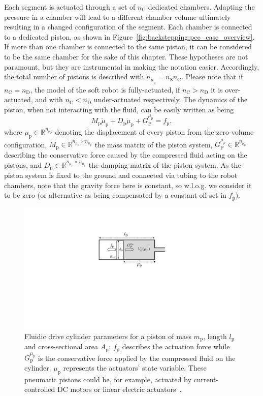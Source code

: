 %
Each segment is actuated through a set of $n_{\mathrm{C}}$ dedicated chambers.
%
Adapting the pressure in a chamber will lead to a different chamber volume ultimately resulting in a changed configuration of the segment.
%
Each chamber is connected to a dedicated piston, as shown in Figure~\ref{fig:backstepping:pcc_case_overview}. If more than one chamber is connected to the same piston, it can be considered to be the same chamber for the sake of this chapter.
%
These hypotheses are not paramount, but they are instrumental in making the notation easier.
%
Accordingly, the total number of pistons is described with $n_{\mu_\mathrm{p}} = n_{\mathrm{S}} n_{\mathrm{C}}$.
%
Please note that if $n_\mathrm{C} = n_\mathrm{D}$, the model of the soft robot is fully-actuated, if $n_\mathrm{C} > n_\mathrm{D}$ it is over-actuated, and with $n_\mathrm{C} < n_\mathrm{D}$ under-actuated respectively.
%
The dynamics of the piston, when not interacting with the fluid, can be easily written as being
%
\begin{equation}
M_\mathrm{p} \ddot{\mu}_\mathrm{p} + D_\mathrm{p} \dot{\mu}_\mathrm{p} + G_{\mathrm{P}}^{\mu_p} = f_\mathrm{p},
\end{equation}
%
where $\mu_\mathrm{p} \in \mathbb{R}^{n_{\mu_\mathrm{p}}}$ denoting the displacement of every piston from the zero-volume configuration, $M_\mathrm{p} \in \mathbb{R}^{n_{\mu_\mathrm{p}} \times n_{\mu_\mathrm{p}}}$ the mass matrix of the piston system, $G_{\mathrm{P}}^{\mu_p} \in \mathbb{R}^{n_{\mu_\mathrm{p}}}$ describing the conservative force caused by the compressed fluid acting on the pistons, and $D_\mathrm{p} \in \mathbb{R}^{n_{\mu_\mathrm{p}} \times n_{\mu_\mathrm{p}}}$ the damping matrix of the piston system. 
As the piston system is fixed to the ground and connected via tubing to the robot chambers, note that the gravity force here is constant, so w.l.o.g. we consider it to be zero (or alternative as being compensated by a constant off\--set in $f_\mathrm{p}$).

\begin{figure}[ht]
  \centering
  \includegraphics[width=0.5\columnwidth]{backstepping/figures/backstepping_graphics_fluidic_drive_cylinder_v4.pdf}
  \caption{Fluidic drive cylinder parameters for a piston of mass $m_\mathrm{p}$, length $l_\mathrm{p}$ and cross-sectional area $A_\mathrm{p}$: $f_\mathrm{p}$ describes the actuation force while $G_\mathrm{P}^{\mu_\mathrm{p}}$ is the conservative force applied by the compressed fluid on the cylinder. $\mu_\mathrm{p}$ represents the actuators' state variable. These pneumatic pistons could be, for example, actuated by current-controlled DC motors or linear electric actuators~\citep{marchese2014design}.}\label{fig:backstepping:fluidic_drive_cylinder}
\end{figure}

